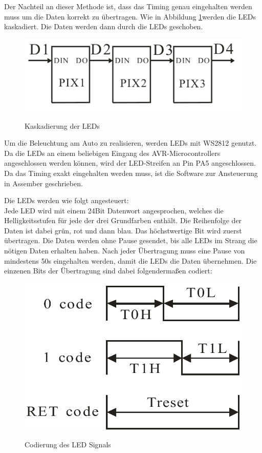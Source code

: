 Der Nachteil an dieser Methode ist, dass das Timing genau eingehalten werden muss um die Daten korrekt zu übertragen. Wie in Abbildung \ref{fig:led_cascade}werden die LEDs kaskadiert. Die Daten werden dann durch die LEDs geschoben.

\begin{figure}[H]
\centering
\includegraphics[width=.8\textwidth]{led_cascade.png}\\
\caption{Kaskadierung der LEDs \cite{ds-WS2812}}%
\label{fig:led_cascade}
\end{figure}

Um die Beleuchtung am Auto zu realisieren, werden LEDs mit WS2812 genutzt. Da die LEDs an einem beliebigen
Eingang des AVR-Microcontrollers angeschlossen werden können, wird der LED-Streifen an Pin PA5 angeschlossen. Da das Timing 
exakt eingehalten werden muss, ist die Software zur Ansteuerung in Assember geschrieben.

Die LEDs werden wie folgt angesteuert:\\
Jede LED wird mit einem 24Bit Datenwort angesprochen, welches die Helligkeitsstufen für jede der drei Grundfarben enthält. 
Die Reihenfolge der Daten ist dabei grün, rot und dann blau. Das höchstwertige Bit wird zuerst übertragen.
Die Daten werden ohne Pause gesendet, bis alle LEDs im Strang die nötigen Daten erhalten haben. Nach jeder Übertragung muss eine Pause von mindestens 50\textmu s eingehalten
werden, damit die LEDs die Daten übernehmen. Die einzenen Bits der Übertragung sind dabei folgendermaßen codiert:

\begin{figure}[H]
\centering
\includegraphics[width=.5\textwidth]{led_timing.png}\\
\caption{Codierung des LED Signals \cite{ds-WS2812}}%
\label{fig:led_timing}
\end{figure}

